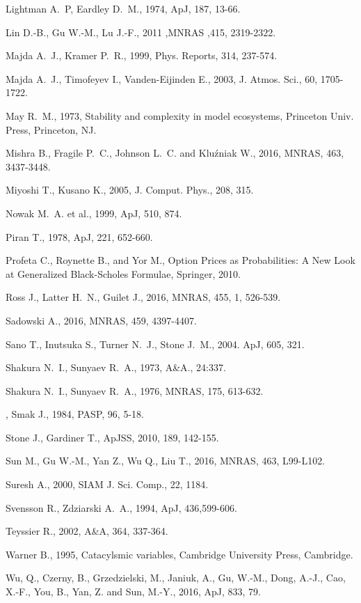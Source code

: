 \documentclass[useAMS]{mn2e}
\begin{document}
\begin{thebibliography}{40}
Lightman A.~P, Eardley D.~M., 1974, ApJ, 187, 13-66.

Lin D.-B., Gu W.-M., Lu J.-F., 2011 ,MNRAS ,415, 2319-2322.

Majda A.~J., Kramer P.~R., 1999, Phys. Reports, 314, 237-574.

Majda A.~J., Timofeyev I., Vanden-Eijinden E., 2003, J. Atmos. Sci., 60, 1705-1722.

May R.~M., 1973, Stability and complexity in model ecosystems, Princeton Univ. Press, Princeton, NJ.

Mishra B., Fragile P.~C., Johnson L.~C. and Klu{\'z}niak W., 2016, MNRAS, 463, 3437-3448.


Miyoshi T., Kusano K., 2005, J. Comput. Phys., 208, 315.


Nowak M.~A. et al., 1999, ApJ, 510, 874.

Piran T., 1978, ApJ, 221, 652-660.

Profeta C., Roynette B., and Yor M., Option Prices as Probabilities: A New Look at Generalized Black-Scholes Formulae, Springer, 2010.

Ross J., Latter H.~N., Guilet J., 2016, MNRAS, 455, 1, 526-539.

Sadowski A., 2016, MNRAS, 459, 4397-4407. 

Sano T., Inutsuka S., Turner N.~J., Stone J.~M., 2004. ApJ, 605, 321.

Shakura N.~I., Sunyaev R.~A., 1973, A\&A., 24:337.


Shakura N.~I., Sunyaev R.~A., 1976, MNRAS, 175, 613-632.

,
Smak J., 1984, PASP, 96, 5-18.


Stone J., Gardiner T., ApJSS, 2010, 189, 142-155.

Sun M., Gu W.-M., Yan Z., Wu Q., Liu T., 2016, MNRAS, 463, L99-L102.


Suresh A., 2000, SIAM J. Sci. Comp., 22, 1184.

Svensson R., Zdziarski A.~A., 1994, ApJ, 436,599-606.

Teyssier R., 2002, A\&A, 364, 337-364.

Warner B., 1995, Catacylsmic variables, Cambridge University Press, Cambridge.

Wu, Q., Czerny, B., Grzedzielski, M., Janiuk, A., Gu, W.-M., Dong, A.-J., Cao, X.-F., You, B., Yan, Z. and Sun, M.-Y., 2016, ApJ, 833, 79.

\end{thebibliography}
\end{document}
